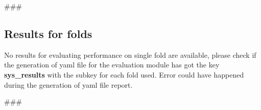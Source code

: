 
\usepackage{comment}

###

\subsection{Results for folds}\label{subsec:folds_res}
No results for evaluating performance on single fold are available, please check if the generation of yaml file for the
evaluation module has got the key \textbf{sys\_results} with the subkey for each fold used.
Error could have happened during the generation of yaml file report.

###


\begin{comment}
Author = DIEGO MICCOLI
Alias = Kozen88
Organization = SWAP Research Group UniBa
Date = 27-12-2023

This mini template is not working by itself because there are latex command missing needed
to compile the file and give as output a pdf file, in addition it has been added jinja
statement in order to control the rendering of the latex file with the jinja library, for these
reasons it needs to be used with the other mini chunks in conjunction.
\end{comment}